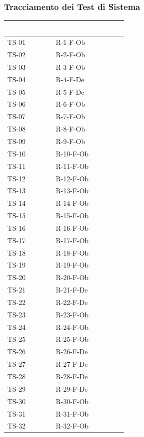 \documentclass[a4paper, 11pt]{article}
\renewcommand{\arraystretch}{1.4} %
\begin{document}
\subsubsection{Tracciamento dei Test di Sistema}
\renewcommand{\arraystretch}{1.4}
\setlength{\LTleft}{0pt plus 1fill}\setlength{\LTright}{0pt plus 1fill}\begin{longtable}{>{\centering\arraybackslash}m{2.5cm} >{\centering\arraybackslash}m{3.5cm}}
\rowcolor{AccentColor}
\textcolor{white}{\textbf{Codice Test}} & \textcolor{white}{\textbf{Codice Requisito\textsuperscript{G}}} \\
\endhead

TS-01 & R-1-F-Ob \\
TS-02 & R-2-F-Ob \\
TS-03 & R-3-F-Ob \\
TS-04 & R-4-F-De \\
TS-05 & R-5-F-De \\
TS-06 & R-6-F-Ob \\
TS-07 & R-7-F-Ob \\
TS-08 & R-8-F-Ob \\
TS-09 & R-9-F-Ob \\
TS-10 & R-10-F-Ob \\
TS-11 & R-11-F-Ob \\
TS-12 & R-12-F-Ob \\
TS-13 & R-13-F-Ob \\
TS-14 & R-14-F-Ob \\
TS-15 & R-15-F-Ob \\
TS-16 & R-16-F-Ob \\
TS-17 & R-17-F-Ob \\
TS-18 & R-18-F-Ob \\
TS-19 & R-19-F-Ob \\
TS-20 & R-20-F-Ob \\
TS-21 & R-21-F-De \\
TS-22 & R-22-F-De \\
TS-23 & R-23-F-Ob \\
TS-24 & R-24-F-Ob \\
TS-25 & R-25-F-Ob \\
TS-26 & R-26-F-De \\
TS-27 & R-27-F-De \\
TS-28 & R-28-F-De \\
TS-29 & R-29-F-De \\
TS-30 & R-30-F-Ob \\
TS-31 & R-31-F-Ob \\
TS-32 & R-32-F-Ob \\

\end{longtable}
\end{document}
